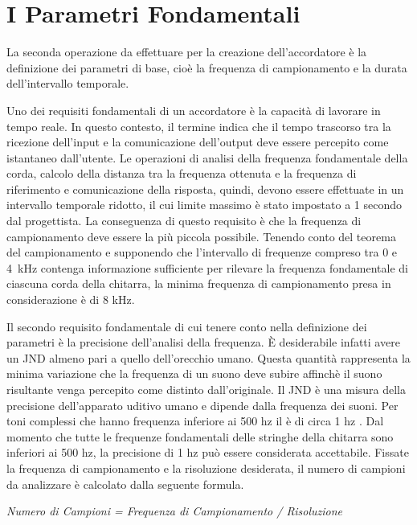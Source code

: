 \chapter*{I Parametri Fondamentali}\label{cap:parametri}

La seconda operazione da effettuare per la creazione dell'accordatore è la definizione dei parametri di base, cioè la frequenza di campionamento e la durata dell'intervallo temporale.  

Uno dei requisiti fondamentali di un accordatore è la capacità di lavorare in tempo reale. 
In questo contesto, il termine indica che il tempo trascorso tra la ricezione dell'input e la comunicazione dell'output deve essere percepito come istantaneo dall'utente. 
Le operazioni di analisi della frequenza fondamentale della corda, calcolo della distanza tra la frequenza ottenuta e la frequenza di riferimento e comunicazione della risposta, quindi, devono essere effettuate in un intervallo temporale ridotto, il cui limite massimo è stato impostato a 1 secondo dal progettista.
La conseguenza di questo requisito è che la frequenza di campionamento deve essere la più piccola possibile. 
Tenendo conto del teorema del campionamento e supponendo che l'intervallo di frequenze compreso tra 0 e \mbox{4 kHz} contenga informazione sufficiente per rilevare la frequenza fondamentale di ciascuna corda della chitarra, la minima frequenza di campionamento presa in considerazione è di 8 kHz.

Il secondo requisito fondamentale di cui tenere conto nella definizione dei parametri è la precisione dell'analisi della frequenza.
È desiderabile infatti avere un \mbox{JND} almeno pari a quello dell'orecchio umano. 
Questa quantità rappresenta la minima variazione che la frequenza di un suono deve subire affinchè il suono risultante venga percepito come distinto dall'originale. 
Il \mbox{JND} è una misura della precisione dell'apparato uditivo umano e dipende dalla frequenza dei suoni.
Per toni complessi che hanno frequenza inferiore ai 500 hz il è di circa 1 hz . 
Dal momento che tutte le frequenze fondamentali delle stringhe della chitarra sono inferiori ai 500 hz, la precisione di 1 hz può essere considerata accettabile.
Fissate la frequenza di campionamento e la risoluzione desiderata, il numero di campioni da analizzare è calcolato dalla seguente formula.

\vspace{0.2cm}
\centerline{\textit{Numero di Campioni = Frequenza di Campionamento / Risoluzione}}
\vspace{0.2cm}

